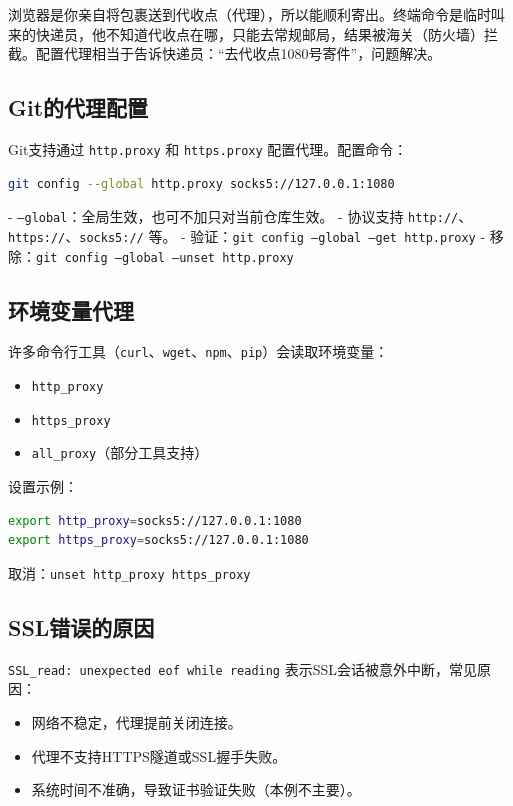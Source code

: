 \documentclass[12pt,a4paper]{article}
\begin{document}
\begin{tcolorbox}[colback=blue!5!white,colframe=blue!75!black,title=生动比喻：快递代收点]
浏览器是你亲自将包裹送到代收点（代理），所以能顺利寄出。终端命令是临时叫来的快递员，他不知道代收点在哪，只能去常规邮局，结果被海关（防火墙）拦截。配置代理相当于告诉快递员：“去代收点1080号寄件”，问题解决。
\end{tcolorbox}

\subsection{Git的代理配置}
Git支持通过 \texttt{http.proxy} 和 \texttt{https.proxy} 配置代理。配置命令：
\begin{lstlisting}[language=bash]
git config --global http.proxy socks5://127.0.0.1:1080
\end{lstlisting}
- \texttt{--global}：全局生效，也可不加只对当前仓库生效。
- 协议支持 \texttt{http://}、\texttt{https://}、\texttt{socks5://} 等。
- 验证：\texttt{git config --global --get http.proxy}
- 移除：\texttt{git config --global --unset http.proxy}

\subsection{环境变量代理}
许多命令行工具（\texttt{curl}、\texttt{wget}、\texttt{npm}、\texttt{pip}）会读取环境变量：
\begin{itemize}
    \item \texttt{http\_proxy}
    \item \texttt{https\_proxy}
    \item \texttt{all\_proxy}（部分工具支持）
\end{itemize}
设置示例：
\begin{lstlisting}[language=bash]
export http_proxy=socks5://127.0.0.1:1080
export https_proxy=socks5://127.0.0.1:1080
\end{lstlisting}
取消：\texttt{unset http\_proxy https\_proxy}

\subsection{SSL错误的原因}
\texttt{SSL\_read: unexpected eof while reading} 表示SSL会话被意外中断，常见原因：
\begin{itemize}
    \item 网络不稳定，代理提前关闭连接。
    \item 代理不支持HTTPS隧道或SSL握手失败。
    \item 系统时间不准确，导致证书验证失败（本例不主要）。
\end{itemize}
\end{document}
